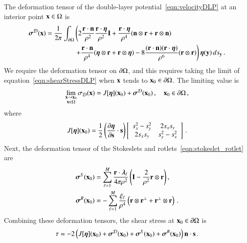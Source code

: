 \documentclass[preprint, 10pt]{elsarticle}
\begin{document}
The deformation tensor of the double-layer potential~\eqref{eqn:velocityDLP} at an interior point ${\mathbf{x}} \in \Omega$ is~\cite{qua-bir2014a}
\begin{equation}
  \label{eqn:shearStressDLP}
  \begin{aligned}
  {\boldsymbol\sigma}^{\mathcal{D}}({\mathbf{x}}) = \frac{1}{2\pi}\int_{{\partial}\Omega} &\left(
    2\frac{{\mathbf{r}} \cdot {\mathbf{n}}}{\rho^2} \frac{{\mathbf{r}} \cdot {\boldsymbol\eta}}{\rho^2} {\mathbf{I}} + 
    \frac{{\mathbf{r}} \cdot {\boldsymbol\eta}}{\rho^4} ({\mathbf{n}} \otimes {\mathbf{r}} + {\mathbf{r}} \otimes {\mathbf{n}}) 
    \right. \\
    &\left.
    +\frac{{\mathbf{r}} \cdot {\mathbf{n}}}{\rho^4} ({\boldsymbol\eta} \otimes {\mathbf{r}} + {\mathbf{r}} \otimes {\boldsymbol\eta}) - 
    8\frac{({\mathbf{r}} \cdot {\mathbf{n}})({\mathbf{r}} \cdot {\boldsymbol\eta})}{\rho^6}({\mathbf{r}} \otimes {\mathbf{r}})
  \right) {\boldsymbol\eta}({\mathbf{y}}) \, ds_{\mathbf{y}} \, .
  \end{aligned}
\end{equation}
We require the deformation tensor on ${\partial}\Omega$, and this requires taking the limit of equation~\eqref{eqn:shearStressDLP} when ${\mathbf{x}}$ tends to ${\mathbf{x}}_0 \in {\partial}\Omega$.  The limiting value is
\begin{align}
  \lim_{\substack{{\mathbf{x}} \rightarrow {\mathbf{x}}_0 \\ {\mathbf{x}} \in \Omega}}\sigma_{\mathcal{D}}({\mathbf{x}}) =
  J[{\boldsymbol\eta}]({\mathbf{x}}_0) + {\boldsymbol\sigma}^{\mathcal{D}}({\mathbf{x}}_0)\, , \quad {\mathbf{x}}_0 \in {\partial}\Omega \, ,
\end{align} 
where
\begin{align}
  J[{\boldsymbol\eta}]({\mathbf{x}}_0) = \frac{1}{2}\left(\frac{\partial {\boldsymbol\eta}}{\partial {\mathbf{s}}} 
    \cdot {\mathbf{s}}\right) \left[ 
  \begin{array}{cc}
    s_x^2 - s_y^2 & 2s_x s_y \\ 2s_x s_y & s_y^2 - s_x^2
  \end{array}\right] \, .
  \label{eqn:shearStressJump}
\end{align}
Next, the deformation tensor of the Stokeslets and rotlets~\eqref{eqn:stokeslet_rotlet} are
\begin{equation}
  \label{eqn:shearStressSR}
  \begin{aligned}
  {\boldsymbol\sigma}^S({\mathbf{x}}_0) &= \sum_{\ell=1}^{M}
    \frac{{\mathbf{r}} \cdot {\boldsymbol\lambda}_\ell}{4\pi\rho^2} \left(
    {\mathbf{I}} - \frac{2}{\rho^2} {\mathbf{r}} \otimes {\mathbf{r}} \right),  \\
  {\boldsymbol\sigma}^R({\mathbf{x}}_0) &= -\sum_{\ell=1}^M
    \frac{\xi_\ell}{\rho^4} \left({\mathbf{r}} \otimes {\mathbf{r}}^\perp + 
    {\mathbf{r}}^\perp \otimes {\mathbf{r}} \right) \, .
  \end{aligned}
\end{equation}
Combining these deformation tensors, the shear stress at ${\mathbf{x}}_0 \in {\partial}\Omega$ is
\begin{align}
  \tau = -2 \left(J[{\boldsymbol\eta}]({\mathbf{x}}_0) + {\boldsymbol\sigma}^{\mathcal{D}}({\mathbf{x}}_0) + 
    {\boldsymbol\sigma}^S({\mathbf{x}}_0) + {\boldsymbol\sigma}^R({\mathbf{x}}_0)\right) {\mathbf{n}} \cdot {\mathbf{s}} \, .
  \label{eqn:shearStressLP}
\end{align}
\end{document}
